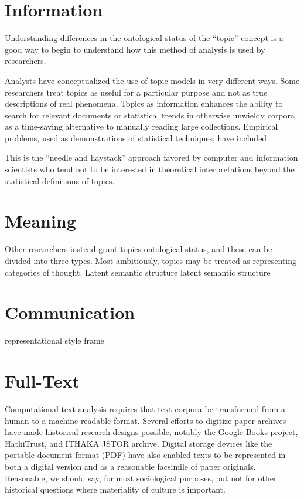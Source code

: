 \documentclass[]{book}
\theoremstyle{definition}
\theoremstyle{definition}
\theoremstyle{definition}
\theoremstyle{remark}
\begin{document}
\hypertarget{information}{%
\section{Information}\label{information}}

Understanding differences in the ontological status of the ``topic''
concept is a good way to begin to understand how this method of analysis
is used by researchers.

Analysts have conceptualized the use of topic models in very different
ways. Some researchers treat topics as useful for a particular purpose
and not as true descriptions of real phenomena. Topics as information
enhances the ability to search for relevant documents or statistical
trends in otherwise unwieldy corpora as a time-saving alternative to
manually reading large collections. \citep{Boyd-Graber2017Applications}
Empirical problems, used as demonstrations of statistical techniques,
have included

This is the ``needle and haystack'' approach favored by computer and
information scientists who tend not to be interested in theoretical
interpretations beyond the statistical definitions of topics.

\hypertarget{meaning}{%
\section{Meaning}\label{meaning}}

Other researchers instead grant topics ontological status, and these can
be divided into three types. Most ambitiously, topics may be treated as
representing categories of thought. Latent semantic structure latent
semantic structure \citep{WallachStatisticalTopicModels2011}

\hypertarget{communication}{%
\section{Communication}\label{communication}}

representational style \citep{Grimmer2016Measuring} frame
\citep{DiMaggio2013Exploiting}

\hypertarget{full-text}{%
\section{Full-Text}\label{full-text}}

Computational text analysis requires that text corpora be transformed
from a human to a machine readable format. Several efforts to digitize
paper archives have made historical research designs possible, notably
the Google Books project, HathiTrust, and ITHAKA JSTOR archive. Digital
storage devices like the portable document format (PDF) have also
enabled texts to be represented in both a digital version and as a
reasonable facsimile of paper originals. Reasonable, we should say, for
most sociological purposes, put not for other historical questions where
materiality of culture is important.
\citep[149]{Schreibman2014NonConsumptive}
\end{document}
